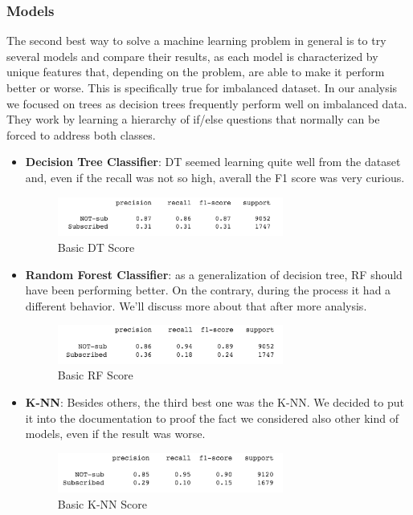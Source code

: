 \subsubsection{Models}
The second best way to solve a machine learning problem in general is to try several models and compare their results, as each model is characterized by unique features that, depending on the problem, are able to make it perform better or worse. This is specifically true for imbalanced dataset. In our analysis we focused on trees as decision trees frequently perform well on imbalanced data.
\\They work by learning a hierarchy of if/else questions that normally can be forced to address both classes.

\begin{itemize}
\item \textbf{Decision Tree Classifier}: DT seemed learning quite well from the dataset and, even if the recall was not so high, averall the F1 score was very curious.

\begin{figure}[H]
\centering
\includegraphics[width=0.7\textwidth]{Img/normal_tree.png}
\caption{Basic DT Score}
\end{figure}
\item \textbf{Random Forest Classifier}: as a generalization of decision tree, RF should have been performing better. On the contrary, during the process it had a different behavior. We'll discuss more about that after more analysis.

\begin{figure}[H]
\centering
\includegraphics[width=0.7\textwidth]{Img/normal_forest.png}
\caption{Basic RF Score}
\end{figure}

\item \textbf{K-NN}: Besides others, the third best one was the K-NN. We decided to put it into the documentation to proof the fact we considered also other kind of models, even if the result was worse.

\begin{figure}[H]
\centering
\includegraphics[width=0.7\textwidth]{Img/normal_knn.png}
\caption{Basic K-NN Score}
\end{figure}
\end{itemize}

